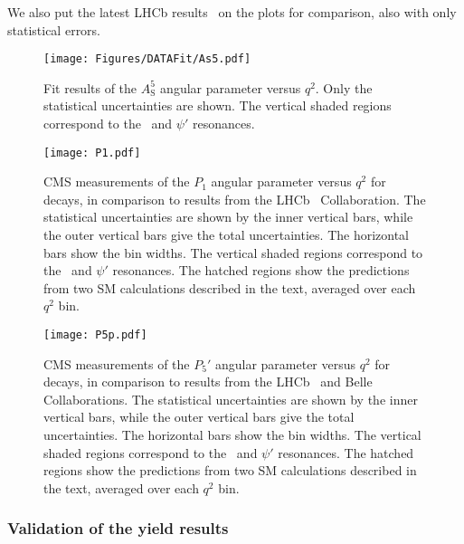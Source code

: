 We also put the latest LHCb results~\cite{LHCbP5p} on the plots for comparison, also with only statistical errors.


\begin{figure}[!hbtp]
  \centering
  \texttt{[image: Figures/DATAFit/As5.pdf]}
  \caption{Fit results of the $A^5_\mathrm{S}$ angular parameter versus $q^2$.
    Only the statistical uncertainties are shown.
    The vertical shaded regions correspond to the \cPJgy\ and $\psi'$ resonances.}
  \label{fig:fitresultAs5}
\end{figure}


\begin{figure}[htbp!]
  \begin{center}
    \texttt{[image: P1.pdf]}
    \caption{CMS measurements of the $P_1$ angular parameter versus $q^2$ for \BtoKstmumu decays, in comparison to results from the LHCb~\cite{LHCbP5p2} Collaboration.
      The statistical uncertainties are shown by the inner vertical bars, while the outer vertical bars give the total uncertainties.
      The horizontal bars show the bin widths. The vertical shaded regions correspond to the \cPJgy\ and $\psi'$ resonances.
      The hatched regions show the predictions from two SM calculations described in the text, averaged over each $q^2$ bin.}
    \label{fig:fitresultP1}
  \end{center}
\end{figure}

\begin{figure}[htbp!]
  \begin{center}
    \texttt{[image: P5p.pdf]}
    \caption{CMS measurements of the $P_5'$ angular parameter versus $q^2$ for \BtoKstmumu decays, in comparison to results from the LHCb~\cite{LHCbP5p2} and Belle~\cite{BelleP5p} Collaborations.
      The statistical uncertainties are shown by the inner vertical bars, while the outer vertical bars give the total uncertainties.
      The horizontal bars show the bin widths. The vertical shaded regions correspond to the \cPJgy\ and $\psi'$ resonances.
      The hatched regions show the predictions from two SM calculations described in the text, averaged over each $q^2$ bin.}
    \label{fig:fitresultp5}
  \end{center}
\end{figure}

\subsubsection{Validation of the yield results}\label{sec:yieldComp}

